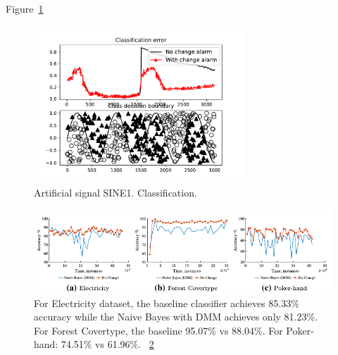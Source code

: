 \documentclass[12 pt]{article}
\begin{document}
  Figure~\ref{fig:sine1_example}
  \begin{figure}[!htb]
    \centering
    \includegraphics[width=0.7\textwidth]{images/proof_of_concept_dt_sine1}
    \caption{Artificial signal SINE1. Classification.}\label{fig:sine1_example}
  \end{figure}

\begin{figure}[htb!]
	\centering
	\includegraphics[height=0.15\textheight]{images_cropped/souza_fig7}
	\caption{
For Electricity dataset, the baseline classifier achieves 85.33\% accuracy while the Naive Bayes with DMM achieves only 81.23\%. For Forest Covertype, the baseline 95.07\% vs 88.04\%. For Poker-hand: 74.51\% vs 61.96\%.
~\ref{fig:fig7_souza}
  }\label{fig:fig7_souza}
\end{figure}


  
  
\end{document}
